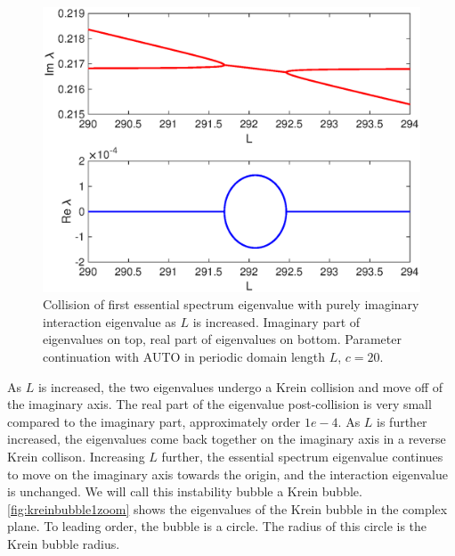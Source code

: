 \documentclass[thesis.tex]{subfiles}
\begin{document}
\begin{figure}[H]
\includegraphics[width=12cm]{images/kdv5numerics/kreinbubble1}
\caption{Collision of first essential spectrum eigenvalue with purely imaginary interaction eigenvalue as $L$ is increased. Imaginary part of eigenvalues on top, real part of eigenvalues on bottom. Parameter continuation with AUTO in periodic domain length $L$, $c = 20$.}
\label{fig:kreinbubble1}
\end{figure}

As $L$ is increased, the two eigenvalues undergo a Krein collision and move off of the imaginary axis. The real part of the eigenvalue post-collision is very small compared to the imaginary part, approximately order $1e-4$. As $L$ is further increased, the eigenvalues come back together on the imaginary axis in a reverse Krein collison. Increasing $L$ further, the essential spectrum eigenvalue continues to move on the imaginary axis towards the origin, and the interaction eigenvalue is unchanged. We will call this instability bubble a Krein bubble. \cref{fig:kreinbubble1zoom} shows the eigenvalues of the Krein bubble in the complex plane. To leading order, the bubble is a circle. The radius of this circle is the Krein bubble radius.
\end{document}
